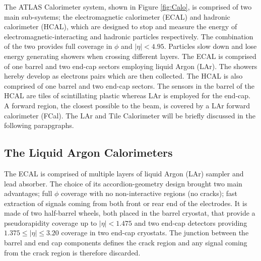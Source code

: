 			The ATLAS Calorimeter system, shown in Figure \ref{fig:Calo}, is comprised of two main sub-systems; the electromagnetic calorimeter (ECAL) and hadronic calorimeter (HCAL), which are designed to stop and measure the energy of electromagnetic-interacting and hadronic particles respectively. The combination of the two provides full coverage in $\phi$ and $\left | \eta \right | < 4.95$. Particles slow down and lose energy generating showers when crossing different layers. The ECAL is comprised of one barrel and two end-cap sectors employing liquid Argon (LAr). The showers hereby develop as electrons pairs which are then collected. The HCAL is also comprised of one barrel and two end-cap sectors. The sensors in the barrel of the HCAL are tiles of scintillating plastic whereas LAr is employed for the end-cap. A forward region, the closest possible to the beam, is covered by a LAr forward calorimeter (FCal). The LAr and Tile Calorimeter will be briefly discussed in the following parapgraphs. 

			\subsection*{The Liquid Argon Calorimeters}

 				The ECAL is comprised of multiple layers of liquid Argon (LAr) sampler and lead absorber. The choice of its accordion-geometry design brought two main advantages; full $\phi$ coverage with no non-interactive regions (no cracks); fast extraction of signals coming from both front or rear end of the electrodes. It is made of two half-barrel wheels, both placed in the barrel cryostat, that provide a pseudorapidity coverage up to $\left | \eta\right | < 1.475$ and two end-cap detectors providing $1.375 \leq \left|\eta\right| \leq 3.20$ coverage in two end-cap cryostats. The junction between the barrel and end cap components defines the crack region and any signal coming from the crack region is therefore discarded. 

